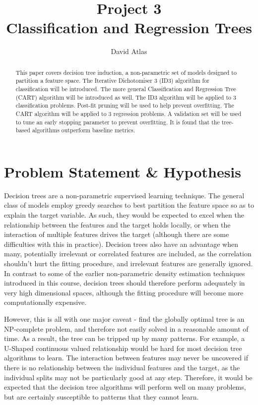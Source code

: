 \documentclass{amsart}
\title{Project 3 \\ Classification and Regression Trees}
\author{David Atlas}
\begin{document}
    \maketitle
    \begin{abstract}
    This paper covers decision tree induction, a non-parametric
    set of models designed to partition a feature space. The Iterative Dichotomiser 3 (ID3)
    algorithm for classification will be introduced. The more general
    Classification and Regression Tree (CART) algorithm will be introduced as well.
    The ID3 algorithm will be applied to 3 classification problems.
    Post-fit pruning will be used to help prevent overfitting.
    The CART algorithm will be applied to 3 regression problems.
    A validation set will be used to tune an early stopping parameter to
    prevent overfitting. It is found that the tree-based algorithms
    outperform baseline metrics.
    \end{abstract}

    \section{Problem Statement \& Hypothesis}
    Decision trees are a non-parametric supervised learning technique.
    The general class of models employ greedy searches to best partition
    the feature space so as to explain the target variable. As such, they would
    be expected to excel when the relationship between the features and the target
    holds locally, or when the interaction of multiple features drives the target (although
    there are some difficulties with this in practice). Decision trees also have an advantage
    when many, potentially irrelevant or correlated features are included, as
    the correlation shouldn't hurt the fitting procedure, and irrelevant features are
    generally ignored. In contrast to some of the earlier non-parametric
    density estimation techniques introduced in this course, decision trees should therefore
    perform adequately in very high dimensional spaces, although the fitting procedure will
    become more computationally expensive.

    However, this is all with one major caveat - find the globally optimal tree is an NP-complete problem,
    and therefore not easily solved in a reasonable amount of time. As a result, the tree can be tripped up by many
    patterns. For example, a U-Shaped continuous valued relationship would be hard for most decision tree algorithms to learn.
    The interaction between features may never be uncovered if there is no relationship between the individual features and the
    target, as the individual splits may not be particularly good at any step.
    Therefore, it would be expected that the decision tree algorithms will perform well on many problems, but are certainly
    susceptible to patterns that they cannot learn.
\end{document}
